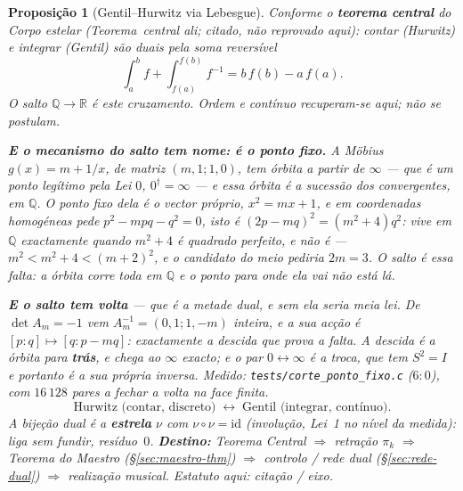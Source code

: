 \documentclass[11pt,a4paper]{article}
\newtheorem{proposicao}{Proposição}
\newcommand{\code}[1]{\texttt{#1}}
\begin{document}
\begin{proposicao}[Gentil--Hurwitz via Lebesgue]\label{thm:central-peano}
Conforme o \textbf{teorema central} do \emph{Corpo estelar}
(Teorema~central ali; citado, não reprovado aqui): contar (Hurwitz) e
integrar (Gentil) são duais pela soma reversível
\[
\int_a^{b}f+\int_{f(a)}^{f(b)}f^{-1}=b\,f(b)-a\,f(a).
\]
O salto $\mathbb{Q}\to\mathbb{R}$ é este cruzamento. Ordem e contínuo
recuperam-se aqui; não se postulam.

\noindent \textbf{E o mecanismo do salto tem nome: é o ponto fixo.} A Möbius
$g(x)=m+1/x$, de matriz $(m,1;1,0)$, tem órbita a
partir de $\infty$ --- que é um ponto legítimo pela Lei $0$, $0^{\dagger}=\infty$ --- e essa
órbita é a sucessão dos convergentes, em $\mathbb{Q}$. O ponto fixo dela é o vector
próprio, $x^{2}=mx+1$, e em coordenadas homogéneas pede $p^{2}-mpq-q^{2}=0$, isto é
$(2p-mq)^{2}=(m^{2}+4)q^{2}$: vive em $\mathbb{Q}$ \emph{exactamente quando} $m^{2}+4$ é
quadrado perfeito, e não é --- $m^{2}<m^{2}+4<(m+2)^{2}$, e o candidato do meio pediria
$2m=3$. \emph{O salto é essa falta}: a órbita corre toda em $\mathbb{Q}$ e o ponto para
onde ela vai não está lá.

\noindent \textbf{E o salto tem volta} --- que é a metade dual, e sem ela seria meia lei.
De $\det A_m=-1$ vem $A_m^{-1}=(0,1;1,-m)$ \emph{inteira}, e a sua acção é
$[p:q]\mapsto[q:p-mq]$: exactamente a descida que prova a falta. A descida é a órbita para
\textbf{trás}, e chega ao $\infty$ exacto; e o par $0\leftrightarrow\infty$ é a troca, que
tem $S^{2}=I$ e portanto é a sua própria inversa. \emph{Medido:}
\code{tests/corte\_ponto\_fixo.c} ($6{:}0$), com $16\,128$ pares a fechar a volta na face
finita.
\[
\boxed{
\text{Hurwitz (contar, discreto)}
\;\longleftrightarrow\;
\text{Gentil (integrar, contínuo)}.
}
\]
A bijeção dual é a \textbf{estrela} $\nu$ com $\nu\circ\nu=\mathrm{id}$
(involução, Lei~1 no nível da medida): liga sem fundir, resíduo~$0$.
\textbf{Destino:} Teorema Central $\Rightarrow$ retração $\pi_k$
$\Rightarrow$ Teorema do Maestro (\S\ref{sec:maestro-thm})
$\Rightarrow$ controlo / rede dual (\S\ref{sec:rede-dual})
$\Rightarrow$ realização musical. Estatuto aqui: \emph{citação / eixo}.
\end{proposicao}
\end{document}
